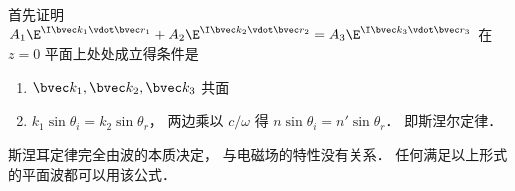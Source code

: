 

首先证明 $A_1 \E^{\I \bvec k_1 \vdot \bvec r_1} + A_2 \E^{\I \bvec k_2 \vdot \bvec r_2} = A_3 \E^{\I \bvec k_3 \vdot \bvec r_3}$ 在 $z = 0$ 平面上处处成立得条件是

\begin{enumerate}
\item $\bvec k_1, \bvec k_2, \bvec k_3$ 共面
\item $k_1 \sin \theta_i = k_2 \sin \theta_r$， 两边乘以 $c/\omega$ 得 $n \sin\theta_i = n' \sin \theta_r$． 即斯涅尔定律．
\end{enumerate}
斯涅耳定律完全由波的本质决定， 与电磁场的特性没有关系． 任何满足以上形式的平面波都可以用该公式．
